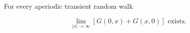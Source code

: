 For every aperiodic transient random walk

$$\lim_{|x| \to \infty} [G(0,x) + G(x,0)] \text{ exists.}$$